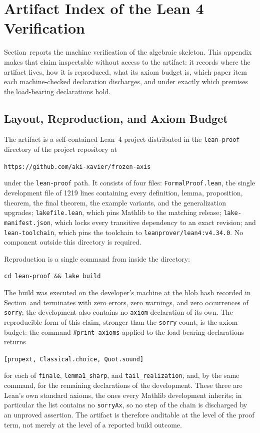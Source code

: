 \section{Artifact Index of the Lean 4 Verification}

Section~\pSecVerify reports the machine verification of the algebraic skeleton. This appendix makes that claim inspectable without access to the artifact: it records where the artifact lives, how it is reproduced, what its axiom budget is, which paper item each machine-checked declaration discharges, and under exactly which premises the load-bearing declarations hold.

\subsection{Layout, Reproduction, and Axiom Budget}

The artifact is a self-contained Lean~4 project distributed in the \texttt{lean-proof} directory of the project repository at
\begin{center}
\texttt{https://github.com/aki-xavier/frozen-axis}
\end{center}
under the \texttt{lean-proof} path. It consists of four files: \texttt{FormalProof.lean}, the single development file of 1219 lines containing every definition, lemma, proposition, theorem, the final theorem, the example variants, and the generalization upgrades; \texttt{lakefile.lean}, which pins Mathlib to the matching release; \texttt{lake-manifest.json}, which locks every transitive dependency to an exact revision; and \texttt{lean-toolchain}, which pins the toolchain to \texttt{leanprover/lean4:v4.34.0}. No component outside this directory is required.

Reproduction is a single command from inside the directory:
\begin{center}
\texttt{cd lean-proof \&\& lake build}
\end{center}
The build was executed on the developer's machine at the blob hash recorded in Section~\pSecVerify and terminates with zero errors, zero warnings, and zero occurrences of \texttt{sorry}; the development also contains no \texttt{axiom} declaration of its own. The reproducible form of this claim, stronger than the \texttt{sorry}-count, is the axiom budget: the command \texttt{\#print axioms} applied to the load-bearing declarations returns
\begin{center}
\texttt{[propext, Classical.choice, Quot.sound]}
\end{center}
for each of \texttt{finale}, \texttt{lemma1\_sharp}, and \texttt{tail\_realization}, and, by the same command, for the remaining declarations of the development. These three are Lean's own standard axioms, the ones every Mathlib development inherits; in particular the list contains no \texttt{sorryAx}, so no step of the chain is discharged by an unproved assertion. The artifact is therefore auditable at the level of the proof term, not merely at the level of a reported build outcome.

